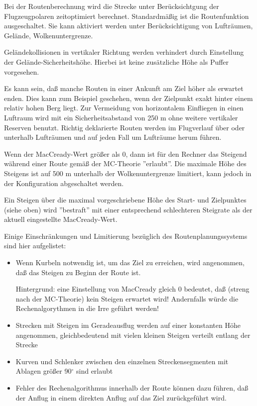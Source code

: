 Bei der Routenberechnung wird die Strecke unter Berücksichtgung der Flugzeugpolaren zeitoptimiert berechnet. Standardmäßig ist die Routenfunktion ausgeschaltet. Sie kann aktiviert werden unter   Berücksichtigung von Lufträumen, Gelände, Wolkenuntergrenze.

Geländekollisionen in vertikaler Richtung werden verhindert durch Einstellung der Gelände-Sicherheitshöhe.  Hierbei ist keine zusätzliche Höhe als Puffer vorgesehen.

Es kann sein, daß manche Routen in einer Ankunft am Ziel höher als erwartet enden. Dies kann zum Beispiel geschehen, wenn der Zielpunkt exakt hinter einem relativ hohen Berg liegt. Zur Vermeidung von horizontalem Einfliegen in einen Luftraum wird mit ein Sicherheitsabstand von 250 m ohne weitere vertikaler Reserven benutzt.
Richtig deklarierte Routen werden im Flugverlauf über oder unterhalb Lufträumen und auf jeden Fall um Lufträume herum führen.

\warning
Wenn der MacCready-Wert größer als 0, dann ist für den Rechner das Steigend während einer Route gemäß der MC-Theorie ''erlaubt''.   Die maximale Höhe des Steigens  ist auf  500 m unterhalb der Wolkenuntergrenze limitiert, kann jedoch in der Konfiguration abgeschaltet werden.

Ein Steigen über die maximal vorgeschriebene Höhe des Start- und Zielpunktes (siehe oben) wird ''bestraft'' mit einer entsprechend schlechteren Steigrate als der aktuell eingestellte MacCready-Wert. 


Einige Einschränkungen und Limitierung bezüglich des Routenplanungssystems sind hier aufgelistet:

\begin{itemize}
\item Wenn Kurbeln notwendig ist, um das Ziel zu erreichen,  wird angenommen, daß das Steigen zu Beginn der Route ist. 

Hintergrund: eine Einstellung von  MacCready gleich 0 bedeutet, daß (streng nach der MC-Theorie) kein Steigen erwartet wird!  Andernfalls würde die Rechenalgorythmen in  die Irre geführt werden!   
\item Strecken mit Steigen im Geradeausflug werden auf einer konstanten Höhe angenommen, gleichbedeutend mit vielen kleinen Steigen verteilt entlang der Strecke
\item Kurven und Schlenker zwischen den einzelnen Streckensegmenten mit Ablagen größer 90$^\circ$ sind erlaubt
\item Fehler des Rechenalgorithmus innerhalb der Route können dazu führen, daß der Anflug in einem direkten Anflug auf das Ziel zurückgeführt wird.
\end{itemize}
